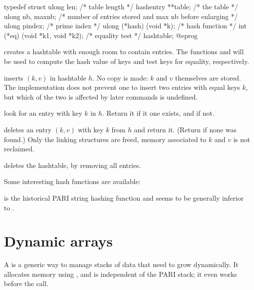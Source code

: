 typedef struct {
  ulong len; /* table length */
  hashentry **table; /* the table */
  ulong nb, maxnb; /* number of entries stored and max nb before enlarging */
  ulong pindex; /* prime index */
  ulong (*hash) (void *k); /* hash function */
  int (*eq) (void *k1, void *k2); /* equality test */
} hashtable;
@eprog\noindent

\hfil\break
creates a hashtable with enough room to contain  entries.
The functions  and  will be used to compute the hash value
of keys and test keys for equality, respectively.

 inserts $(k,v)$
in hashtable $h$. No copy is made: $k$ and $v$ themselves are stored. The
implementation does not prevent one to insert two entries with equal
keys $k$, but which of the two is affected by later commands is undefined.

 look for an entry
with key $k$ in $h$. Return it if it one exists, and  if not.

 deletes an entry $(k,v)$
with key $k$ from $h$ and return it. (Return  if none was found.)
Only the linking structures are freed, memory associated to $k$ and $v$
is not reclaimed.

 deletes the hashtable, by removing all
entries.

Some interesting hash functions are available:


 is the historical PARI string hashing
function and seems to be generally inferior to .


\section{Dynamic arrays}

A  is a generic way to manage stacks of data that need
to grow dynamically. It allocates memory using , and is
independent of the PARI stack; it even works before the  call.


